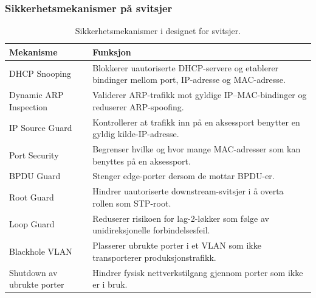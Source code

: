 \subsubsection{Sikkerhetsmekanismer på svitsjer}
\begin{table}[H]

\centering
\caption{Sikkerhetsmekanismer i designet for svitsjer.}
\vspace{5pt}
\small

\setlength{\tabcolsep}{6pt}


\begin{tabular}{
    >{\raggedright\arraybackslash}p{3.8cm}
    >{\raggedright\arraybackslash}p{9.9cm}
}

\toprule

\rowcolor{tablegreen}
\color{white}\textbf{Mekanisme} &
\color{white}\textbf{Funksjon} \\

\midrule

DHCP Snooping &
Blokkerer uautoriserte DHCP-servere og etablerer bindinger mellom port, IP-adresse og MAC-adresse. \\

Dynamic ARP Inspection &
Validerer ARP-trafikk mot gyldige IP--MAC-bindinger og reduserer ARP-spoofing. \\

IP Source Guard &
Kontrollerer at trafikk inn på en aksessport benytter en gyldig kilde-IP-adresse. \\

Port Security &
Begrenser hvilke og hvor mange MAC-adresser som kan benyttes på en aksessport. \\

BPDU Guard &
Stenger edge-porter dersom de mottar BPDU-er. \\

Root Guard &
Hindrer uautoriserte downstream-svitsjer i å overta rollen som STP-root. \\

Loop Guard &
Reduserer risikoen for lag-2-løkker som følge av unidireksjonelle forbindelsesfeil. \\

Blackhole VLAN &
Plasserer ubrukte porter i et VLAN som ikke transporterer produksjonstrafikk. \\

Shutdown av ubrukte porter &
Hindrer fysisk nettverkstilgang gjennom porter som ikke er i bruk. \\


\end{tabular}
\end{table}
